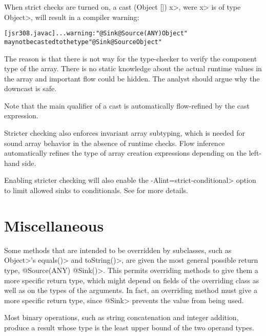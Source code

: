When strict checks are turned on,
a cast \<(Object []) x>, were \<x> is of type \<Object>, will result
in a compiler warning:

\begin{alltt}
[jsr308.javac] ... warning: "@Sink @Source({ANY}) Object"
       may not be casted to the type "@Sink @Source Object"
\end{alltt}

The reason is that there is not way for the type-checker to verify
 the component type of the array. There is no static knowledge about the actual
runtime values in the array and important flow could be hidden.
The analyst should argue why the downcast is safe.

Note that the main qualifier of a cast is automatically flow-refined
by the cast expression.


\medskip

Stricter checking also enforces invariant array subtyping, which is
needed for sound array behavior in the absence of runtime checks.
Flow inference automatically refines the type of array creation
expressions depending on the left-hand side.

\medskip

Enabling stricter checking will also enable the \<-Alint=strict-conditional> option to limit 
allowed sinks to conditionals. See  for more details.

\section{Miscellaneous\label{sec:miscellaneous}}

Some methods that are intended to be overridden by subclasses, such as 
\<Object>'s \<equals()> and \<toString()>, are given the most general
possible return type, \<@Source(ANY) @Sink({})>.
This permits overriding methods to give them a more specific return type, which
might depend on fields of the overriding class as well as on the types of
the arguments.  In fact, an overriding method must give a more specific
return type, since \<@Sink> prevents the value from being used.

Most binary operations, such as string concatenation and integer addition,
produce a result whose type is the least upper bound of the two operand types.




